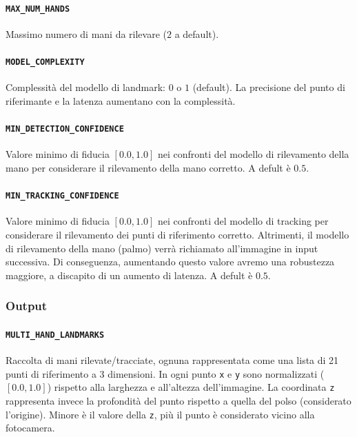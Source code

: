 \paragraph{\texttt{MAX\_NUM\_HANDS}} Massimo numero di mani da rilevare ($2$ a default).

\paragraph{\texttt{MODEL\_COMPLEXITY}} Complessità del modello di landmark: $0$ o $1$ (default). La precisione del punto di riferimante e la latenza aumentano con la complessità.

\paragraph{\texttt{MIN\_DETECTION\_CONFIDENCE}} Valore minimo di fiducia $[0.0, 1.0]$ nei confronti del modello di rilevamento della mano per considerare il rilevamento della mano corretto. A defult è $0.5$.

\paragraph{\texttt{MIN\_TRACKING\_CONFIDENCE}} Valore minimo di fiducia $[0.0, 1.0]$ nei confronti del modello di tracking per considerare il rilevamento dei punti di riferimento corretto. Altrimenti, il modello di rilevamento della mano (palmo) verrà richiamato all'immagine in input successiva. Di conseguenza, aumentando questo valore avremo una robustezza maggiore, a discapito di un aumento di latenza. A defult è $0.5$.

\vspace{+15 px}

\subsubsection{Output}

\paragraph{\texttt{MULTI\_HAND\_LANDMARKS}} Raccolta di mani rilevate/tracciate, ognuna rappresentata come una lista di 21 punti di riferimento a 3 dimensioni. In ogni punto \texttt{x} e \texttt{y} sono normalizzati ($[0.0, 1.0]$) rispetto alla larghezza e all'altezza dell'immagine. La coordinata \texttt{z} rappresenta invece la profondità del punto rispetto a quella del polso (considerato l'origine). Minore è il valore della \texttt{z}, più il punto è considerato vicino alla fotocamera.

